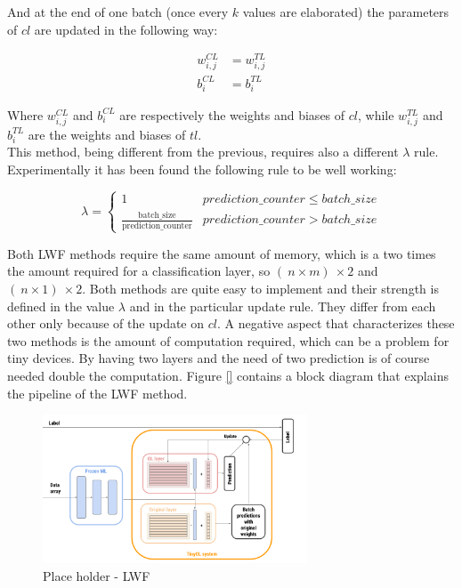 \documentclass[12pt]{report}
\begin{document}
And at the end of one batch (once every $k$ values are elaborated) the parameters of $cl$ are updated in the following way:

\begin{align}
	w^{CL}_{i,j} &= w^{TL}_{i,j}  \\
	b^{CL}_i     &= b^{TL}_i  
\end{align}

Where $w^{CL}_{i,j}$ and $b^{CL}_i$ are respectively the weights and biases of $cl$, while $w^{TL}_{i,j}$ and $b^{TL}_i$ are the weights and biases of $tl$.\\
This method, being different from the previous, requires also a different $\lambda$ rule. Experimentally it has been found the following rule to be well working:

\begin{equation}
\lambda = \left\{
        		\begin{array}{ll}
            		1                                                         & prediction \_ counter \leq batch \_ size \\
            		\frac{\text{batch$\_$size}}{\text{prediction$\_$counter}} & prediction \_ counter >    batch \_ size
        		\end{array}
    		  \right.
\end{equation}

Both LWF methods require the same amount of memory, which is a two times the amount required for a classification layer, so $(\ n \times m )\ \times 2$ and $(\ n \times 1 )\ \times 2$. Both methods are quite easy to implement and their strength is defined in the value $\lambda$ and in the particular update rule. They differ from each other only because of the update on $cl$. A negative aspect that characterizes these two methods is the amount of computation required, which can be a problem for tiny devices. By having two layers and the need of two prediction is of course needed double the computation. Figure \ref{} contains a block diagram that explains the pipeline of the LWF method.

\begin{figure}[h!]
    \centering
    \includegraphics[width=0.7\textwidth]{Figures/Chapter3/LWF.png} 
    \caption{Place holder - LWF}
    \label{fig:block_diag_LWF}    
\end{figure}
\end{document}
